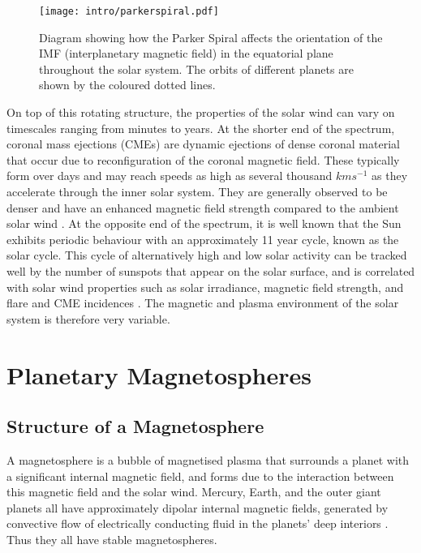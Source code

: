 {\begin{figure}
\centering
\noindent\texttt{[image: intro/parkerspiral.pdf]}
\caption[Diagram of the Parker Spiral throughout the solar system.]{Diagram showing how the Parker Spiral affects the orientation of the IMF (interplanetary magnetic field) in the equatorial plane throughout the solar system. The orbits of different planets are shown by the coloured dotted lines.}
\label{intro:fig:parkerspiral}
\end{figure}

On top of this rotating structure, the properties of the solar wind can vary on timescales ranging from minutes to years. At the shorter end of the spectrum, coronal mass ejections (CMEs) are dynamic ejections of dense coronal material that occur due to reconfiguration of the coronal magnetic field. These typically form over days and may reach speeds as high as several thousand $\si{kms^{-1}}$ as they accelerate through the inner solar system. They are generally observed to be denser and have an enhanced magnetic field strength compared to the ambient solar wind \citep{russell2016}. At the opposite end of the spectrum, it is well known that the Sun exhibits periodic behaviour with an approximately 11 year cycle, known as the solar cycle. This cycle of alternatively high and low solar activity can be tracked well by the number of sunspots that appear on the solar surface, and is correlated with solar wind properties such as solar irradiance, magnetic field strength, and flare and CME incidences \citep{hathaway2015}. The magnetic and plasma environment of the solar system is therefore very variable.

\section{Planetary Magnetospheres}
\subsection{Structure of a Magnetosphere}
A magnetosphere is a bubble of magnetised plasma that surrounds a planet with a significant internal magnetic field, and forms due to the interaction between this magnetic field and the solar wind. Mercury, Earth, and the outer giant planets all have approximately dipolar internal magnetic fields, generated by convective flow of electrically conducting fluid in the planets' deep interiors \citep{kivelson2014book}. Thus they all have stable magnetospheres.

}
